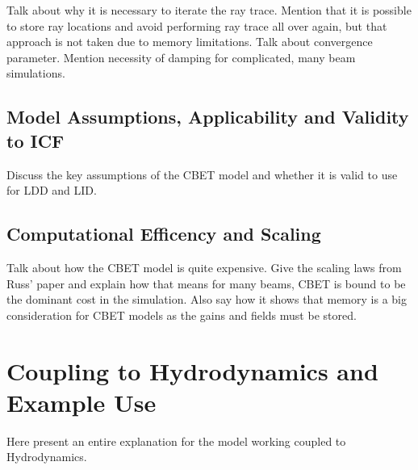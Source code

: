 Talk about why it is necessary to iterate the ray trace.
Mention that it is possible to store ray locations and avoid performing ray trace all over again, but that approach is not taken due to memory limitations.
Talk about convergence parameter.
Mention necessity of damping for complicated, many beam simulations.

\subsection{Model Assumptions, Applicability and Validity to ICF}
\label{sec:model_appliciability}

Discuss the key assumptions of the CBET model and whether it is valid to use for LDD and LID.

\subsection{Computational Efficency and Scaling}

Talk about how the CBET model is quite expensive.
Give the scaling laws from Russ' paper and explain how that means for many beams, CBET is bound to be the dominant cost in the simulation.
Also say how it shows that memory is a big consideration for CBET models as the gains and fields must be stored.


\section{Coupling to Hydrodynamics and Example Use}

Here present an entire explanation for the model working coupled to Hydrodynamics.

